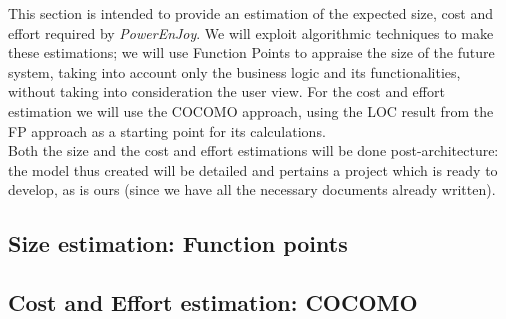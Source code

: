 This section is intended to provide an estimation of the expected size, cost and effort required by \textit{PowerEnJoy}. We will exploit algorithmic techniques to make these estimations; we will use Function Points to appraise the size of the future system, taking into account only the business logic and its functionalities, without taking into consideration the user view. For the cost and effort estimation we will use the COCOMO approach, using the LOC result from the FP approach as a starting point for its calculations.\\
Both the size and the cost and effort estimations will be done post-architecture: the model thus created will be detailed and pertains a project which is ready to develop, as is ours (since we have all the necessary documents already written).

\subsection{Size estimation: Function points}
	

\subsection{Cost and Effort estimation: COCOMO}
	